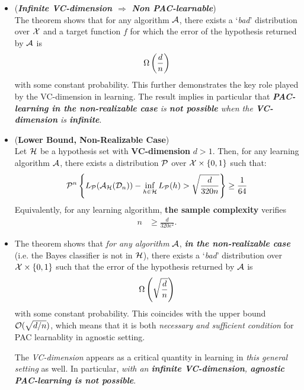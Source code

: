 \documentclass[11pt]{article}
\begin{document}
\begin{itemize}
\item \begin{remark} (\emph{\textbf{Infinite VC-dimension $\Rightarrow$ Non PAC-learnable}})\\
The theorem shows that for any algorithm ${\mathcal A}$, there exists a `\emph{bad}' distribution over ${\mathcal X}$ and a target function $f$ for which the error of the hypothesis returned by ${\mathcal A}$ is
\begin{align*}
\Omega\left(\frac{d}{n}\right)
\end{align*} with some constant probability. This further demonstrates the key role played by the VC-dimension in learning. The result implies in particular that \emph{\textbf{PAC-learning in the non-realizable case} is \textbf{not possible} when the \textbf{VC-dimension} is \textbf{infinite}}.
\end{remark}

\item \begin{proposition} (\textbf{Lower Bound, Non-Realizable Case}) \citep{mohri2018foundations} \\
Let ${\mathcal H}$ be a hypothesis set with \textbf{VC-dimension} $d > 1$. Then, for any learning algorithm ${\mathcal A}$, there exists a distribution ${\mathcal P}$ over ${\mathcal X} \times \left\{0, 1\right\}$ such that:
\begin{align*}
{\mathcal P}^{n}\left\{L_{{\mathcal P}}({\mathcal A}_{{\mathcal H}}({\mathcal D}_n)) - \inf_{h  \in {\mathcal H}}L_{{\mathcal P}}(h)  > \sqrt{\frac{d}{320 n}}\right\} \ge \frac{1}{64}
\end{align*} Equivalently, for any learning algorithm, \textbf{the sample complexity} verifies
\begin{align*}
n &\ge \frac{d}{320 \epsilon^2}.
\end{align*}
\end{proposition}

\item \begin{remark}
The theorem shows that \emph{for any algorithm} ${\mathcal A}$, \emph{\textbf{in the non-realizable case}} (i.e. the Bayes classifier is not in ${\mathcal H}$), there exists
a `\emph{bad}' distribution over ${\mathcal X} \times \left\{0, 1\right\}$ such that the error of the hypothesis returned by ${\mathcal A}$ is
\begin{align*}
\Omega\left(\sqrt{\frac{d}{n}}\right)
\end{align*} with some constant probability. This coincides with the upper bound ${\mathcal O}(\sqrt{d/n})$, which means that it is both \emph{necessary and sufficient condition} for PAC learnablity in agnostic setting.

The \emph{VC-dimension} appears as a critical quantity in learning in \emph{this general setting} as well. In particular, \emph{with an \textbf{infinite VC-dimension}, \textbf{agnostic PAC-learning is not possible}}.
\end{remark}
\end{itemize}
\end{document}
